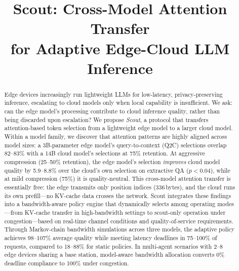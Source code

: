 \documentclass[conference]{IEEEtran}
\newcommand{\QtoC}{\textsc{Q2C}\xspace}
\begin{document}
\title{Scout: Cross-Model Attention Transfer\\for Adaptive Edge-Cloud LLM Inference}

\author{
}

\maketitle

\begin{abstract}
Edge devices increasingly run lightweight LLMs for low-latency, privacy-preserving inference, escalating to cloud models only when local capability is insufficient.
We ask: can the edge model's processing contribute to cloud inference quality, rather than being discarded upon escalation?
We propose \emph{Scout}, a protocol that transfers attention-based token selection from a lightweight edge model to a larger cloud model.
Within a model family, we discover that attention patterns are highly aligned across model sizes: a 3B-parameter edge model's query-to-context (\QtoC) selections overlap 82--83\% with a 14B cloud model's selections at 75\% retention.
At aggressive compression (25--50\% retention), the edge model's selection \emph{improves} cloud model quality by 5.9--8.8\% over the cloud's own selection on extractive QA ($p < 0.04$), while at mild compression (75\%) it is quality-neutral.
This cross-model attention transfer is essentially free: the edge transmits only position indices (336\,bytes), and the cloud runs its own prefill---no KV-cache data crosses the network.
Scout integrates these findings into a bandwidth-aware policy engine that dynamically selects among operating modes---from KV-cache transfer in high-bandwidth settings to scout-only operation under congestion---based on real-time channel conditions and quality-of-service requirements.
Through Markov-chain bandwidth simulations across three models, the adaptive policy achieves 98--107\% average quality while meeting latency deadlines in 75--100\% of requests, compared to 18--88\% for static policies.
In multi-agent scenarios with 2--8 edge devices sharing a base station, model-aware bandwidth allocation converts 0\% deadline compliance to 100\% under congestion.
\end{abstract}
\end{document}
